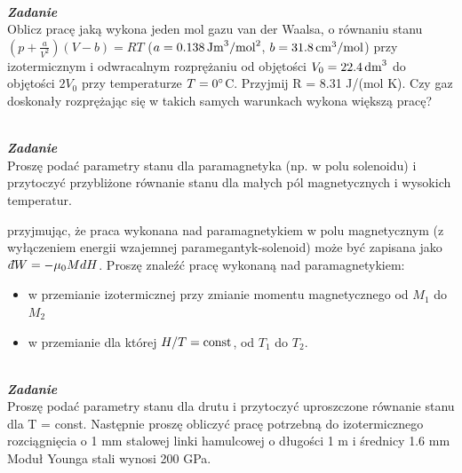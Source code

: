 \documentclass[11pt,a4paper]{article}
\newcounter{zadanie}\newcommand{\zadanie}[1][]{\addtocounter{zadanie}{1} ~\\  {\bf \emph{Zadanie \arabic{zadanie} #1 }} \\}
\newcommand{\dbar}{{\mkern3mu\mathchar'26\mkern-12mu d}}
\renewcommand{\t}[1]{\textrm{#1}}
\begin{document}
\vskip 10pt

\zadanie
Oblicz pracę jaką wykona jeden mol gazu van der Waalsa, o równaniu stanu
$(p+\frac{a}{V^2})(V-b)=RT$
($a=0.138\,\rm{Jm}^3/\rm{mol}^2$, $b=31.8\,\rm{cm^3/mol}$)
przy izotermicznym i odwracalnym rozprężaniu od objętości $V_0=22.4\,\rm{dm}^3$
do objętości $2 V_0$ przy temperaturze $T=0\degree$C. 
Przyjmij R = 8.31 J/(mol K).
Czy gaz doskonały rozprężając się w takich samych warunkach wykona większą pracę?

\vskip 10pt

\zadanie
Proszę podać parametry stanu dla  paramagnetyka (np. w polu solenoidu)
i przytoczyć przybliżone równanie stanu dla małych pól magnetycznych
i wysokich temperatur.

przyjmując, że praca wykonana 
nad paramagnetykiem w polu magnetycznym
(z wyłączeniem energii wzajemnej paramegantyk-solenoid) może być zapisana jako
 $\dbar W = -\mu_0 M dH$.
Proszę znaleźć pracę wykonaną nad paramagnetykiem:
\begin{itemize}
\item w przemianie izotermicznej przy zmianie momentu magnetycznego od $M_1$ do $M_2$
\item w przemianie dla której $H/T={\rm const}$, od $T_1$ do $T_2$. 
\end{itemize}


\pagebreak

\zadanie

Proszę podać parametry stanu dla drutu i przytoczyć 
uproszczone równanie stanu dla T = const.
Następnie proszę obliczyć pracę potrzebną do izotermicznego rozciągnięcia 
o 1 mm stalowej linki hamulcowej o długości 1 m i średnicy 1.6 mm
Moduł Younga stali wynosi 200 GPa.
\end{document}
